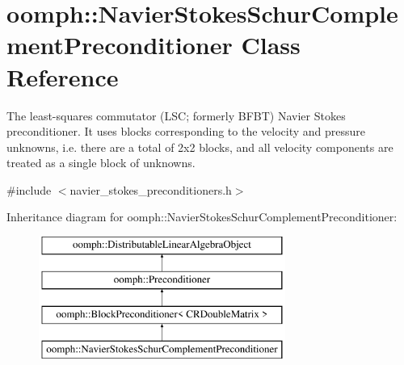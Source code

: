 \hypertarget{classoomph_1_1NavierStokesSchurComplementPreconditioner}{}\section{oomph\+:\+:Navier\+Stokes\+Schur\+Complement\+Preconditioner Class Reference}
\label{classoomph_1_1NavierStokesSchurComplementPreconditioner}


The least-\/squares commutator (L\+SC; formerly B\+F\+BT) Navier Stokes preconditioner. It uses blocks corresponding to the velocity and pressure unknowns, i.\+e. there are a total of 2x2 blocks, and all velocity components are treated as a single block of unknowns.  




{\ttfamily \#include $<$navier\+\_\+stokes\+\_\+preconditioners.\+h$>$}

Inheritance diagram for oomph\+:\+:Navier\+Stokes\+Schur\+Complement\+Preconditioner\+:\begin{figure}[H]
\begin{center}
\leavevmode
\includegraphics[height=4.000000cm]{classoomph_1_1NavierStokesSchurComplementPreconditioner}
\end{center}
\end{figure}
